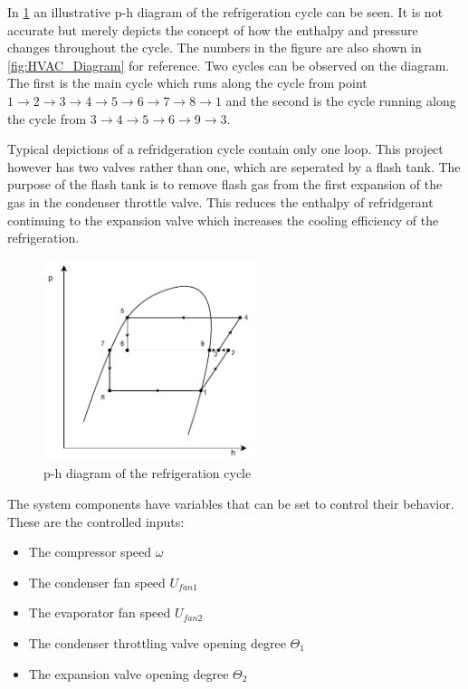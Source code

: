 In \cref{fig:p-h_diagram} an illustrative p-h diagram of the refrigeration cycle can be seen. It is not accurate but merely depicts the concept of how the enthalpy and pressure changes throughout the cycle. The numbers in the figure are also shown in \cref{fig:HVAC_Diagram} for reference. Two cycles can be observed on the diagram. The first is the main cycle which runs along the cycle from point $1 \rightarrow 2\rightarrow 3 \rightarrow 4 \rightarrow 5 \rightarrow 6 \rightarrow 7 \rightarrow 8 \rightarrow 1$ and the second is the cycle running along the cycle from $3 \rightarrow 4 \rightarrow 5 \rightarrow 6 \rightarrow 9 \rightarrow 3$. 

Typical depictions of a refridgeration cycle contain only one loop. This project however has two valves rather than one, which are seperated by a flash tank. The purpose of the flash tank is to remove flash gas from the first expansion of the gas in the condenser throttle valve. This reduces the enthalpy of refridgerant continuing to the expansion valve which increases the cooling efficiency of the refrigeration.\\

\begin{figure}[h!]
	\centering
	\includegraphics[width=0.55\textwidth]{Graphics/Flash_Tank_P-h_Diagram}
	\caption{p-h diagram of the refrigeration cycle}
	\label{fig:p-h_diagram}
\end{figure}


The system components have variables that can be set to control their behavior. These are the controlled inputs:

\begin{itemize}
	\item The compressor speed $ \omega $
	\item The condenser fan speed $ U_{fan1} $
	\item The evaporator fan speed  $ U_{fan2} $
	\item The condenser throttling valve opening degree $ \Theta_1 $
	\item The expansion valve opening degree $ \Theta_2 $
\end{itemize}

